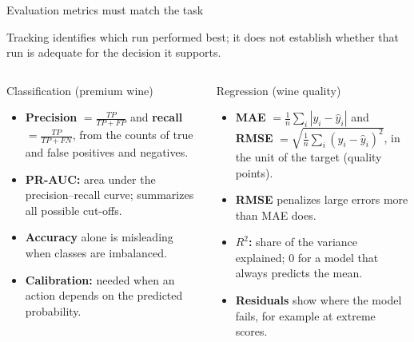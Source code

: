 \begin{frame}{Evaluation metrics must match the task}
{\small Tracking identifies which run performed best; it does not establish whether that run is adequate for the decision it supports.\par}
\vspace{0.3em}
\begin{columns}[T]
\begin{block}{Classification (premium wine)}
\footnotesize
\begin{itemize}\setlength{\itemsep}{2pt}
\item \textbf{Precision} $=\frac{TP}{TP+FP}$ and \textbf{recall} $=\frac{TP}{TP+FN}$, from the counts of true and false positives and negatives.
\item \textbf{PR-AUC:} area under the precision--recall curve; summarizes all possible cut-offs.
\item \textbf{Accuracy} alone is misleading when classes are imbalanced.
\item \textbf{Calibration:} needed when an action depends on the predicted probability.
\end{itemize}
\end{block}
\begin{alertblock}{Regression (wine quality)}
\footnotesize
\begin{itemize}\setlength{\itemsep}{2pt}
\item \textbf{MAE} $=\frac{1}{n}\sum_i |y_i-\hat{y}_i|$ and \textbf{RMSE} $=\sqrt{\frac{1}{n}\sum_i (y_i-\hat{y}_i)^2}$, in the unit of the target (quality points).
\item \textbf{RMSE} penalizes large errors more than MAE does.
\item \textbf{$R^2$:} share of the variance explained; 0 for a model that always predicts the mean.
\item \textbf{Residuals} show where the model fails, for example at extreme scores.
\end{itemize}
\end{alertblock}
\end{columns}
\coursefooter
\end{frame}

